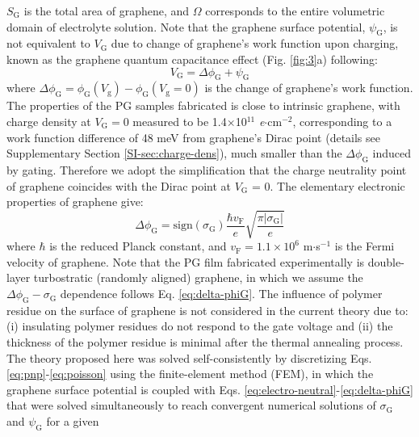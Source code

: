 \documentclass[journal=nalefd,email=true, hyperref=true, keywords=false]{achemso}
\newcommand{\Fig}{Fig.}
\begin{document}
$S_{\mathrm{G}}$ is the total area of graphene, and $\Omega$
corresponds to the entire volumetric domain of electrolyte
solution. Note that the graphene surface potential,
$\psi_{\mathrm{G}}$, is not equivalent to $V_{\mathrm{G}}$ due to
change of graphene's work function upon charging, known as the
graphene quantum capacitance effect\cite{Xia_2009} (\Fig{}
\ref{fig:3}a) following:
\begin{equation}
  \label{eq:Vg}
  V_{\mathrm{G}} = \Delta \phi_{\mathrm{G}} + \psi_{\mathrm{G}}
\end{equation}
where
$\Delta \phi_{\mathrm{G}} = \phi_{\mathrm{G}}(V_{\mathrm{g}}) -
\phi_{\mathrm{G}}(V_{\mathrm{g}}=0)$ is the change of graphene’s work
function. The properties of the PG samples fabricated is close to
intrinsic graphene, with charge density at $V_{\mathrm{G}}=0$ measured
to be 1.4$\times$10$^{11}$ \textit{e}$\cdot$cm$^{-2}$, corresponding
to a work function difference of 48 meV from graphene's Dirac point
(details see Supplementary Section \ref{SI-sec:charge-dens}), much
smaller than the $\Delta \phi_{\mathrm{G}}$ induced by gating.
Therefore we adopt the simplification that the charge neutrality point
of graphene coincides with the Dirac point at $V_{\mathrm{G}}$ =
0. The elementary electronic properties of graphene give:
\begin{equation}
  \label{eq:delta-phiG}
  \Delta \phi_{\mathrm{G}} = \mathrm{sign}(\sigma_{\mathrm{G}}) \frac{\hbar v_{\mathrm{F}}}{e}
  \sqrt{\frac{\pi |\sigma_{\mathrm{G}}|}{e}}
\end{equation}
where $\hbar$ is the reduced Planck constant, and
$v_{\mathrm{F}}=1.1\times10^{6}$ m$\cdot$s$^{-1}$ is the Fermi
velocity of graphene.  Note that the PG film fabricated experimentally
is double-layer turbostratic (randomly aligned) graphene, in which we
assume the $\Delta \phi_{\mathrm{G}} - \sigma_{\mathrm{G}}$ dependence
follows Eq. \eqref{eq:delta-phiG}. The influence of polymer residue on
the surface of graphene is not considered in the current theory due
to: (i) insulating polymer residues do not respond to the gate voltage
and (ii) the thickness of the polymer residue is minimal after the
thermal annealing process. The theory proposed here was solved
self-consistently by discretizing
Eqs. \eqref{eq:pnp}-\eqref{eq:poisson} using the finite-element method
(FEM), in which the graphene surface potential is coupled with
Eqs. \eqref{eq:electro-neutral}-\eqref{eq:delta-phiG} that were solved
simultaneously to reach convergent numerical solutions of
$\sigma_{\mathrm{G}}$ and $\psi_{\mathrm{G}}$ for a given
\end{document}
